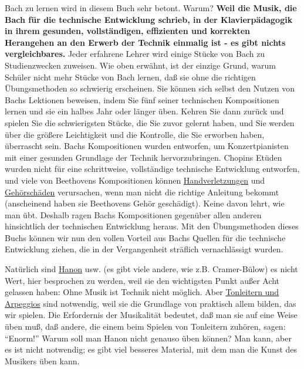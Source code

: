 Bach zu lernen wird in diesem Buch sehr betont.
Warum?
\textbf{Weil die Musik, die Bach für die technische Entwicklung schrieb, in der Klavierpädagogik in ihrem gesunden, vollständigen, effizienten und korrekten Herangehen an den Erwerb der Technik einmalig ist - es gibt nichts vergleichbares.}
Jeder erfahrene Lehrer wird einige Stücke von Bach zu Studienzwecken zuweisen.
Wie oben erwähnt, ist der einzige Grund, warum Schüler nicht mehr Stücke von Bach lernen, daß sie ohne die richtigen Übungsmethoden so schwierig erscheinen.
Sie können sich selbst den Nutzen von Bachs Lektionen beweisen, indem Sie fünf seiner technischen Kompositionen lernen und sie ein halbes Jahr oder länger üben.
Kehren Sie dann zurück und spielen Sie die schwierigsten Stücke, die Sie zuvor gelernt haben, und Sie werden über die größere Leichtigkeit und die Kontrolle, die Sie erworben haben, überrascht sein.
Bachs Kompositionen wurden entworfen, um Konzertpianisten mit einer gesunden Grundlage der Technik hervorzubringen.
Chopins Etüden wurden nicht für eine schrittweise, vollständige technische Entwicklung entworfen, und viele von Beethovens Kompositionen können \hyperlink{c1iii10hand}{Handverletzungen} und \hyperlink{c1iii10gehoer}{Gehörschäden} verursachen, wenn man nicht die richtige Anleitung bekommt (anscheinend haben sie Beethovens Gehör geschädigt).
Keine davon lehrt, wie man übt.
Deshalb ragen Bachs Kompositionen gegenüber allen anderen hinsichtlich der technischen Entwicklung heraus.
Mit den Übungsmethoden dieses Buchs können wir nun den vollen Vorteil aus Bachs Quellen für die technische Entwicklung ziehen, die in der Vergangenheit sträflich vernachlässigt wurden.

Natürlich sind \hyperlink{c1iii7h}{Hanon} usw. (es gibt viele andere, wie z.B. Cramer-Bülow) es nicht Wert, hier besprochen zu werden, weil sie den wichtigsten Punkt außer Acht gelassen haben: Ohne Musik ist Technik nicht möglich.
Aber \hyperlink{c1iii7d}{Tonleitern und Arpeggios} sind notwendig, weil sie die Grundlage von praktisch allem bilden, das wir spielen.
Die Erfordernis der Musikalität bedeutet, daß man sie auf eine Weise üben muß, daß andere, die einem beim Spielen von Tonleitern zuhören, sagen: \enquote{Enorm!}
Warum soll man Hanon nicht genauso üben können?
Man kann, aber es ist nicht notwendig; es gibt viel besseres Material, mit dem man die Kunst des Musikers üben kann.

